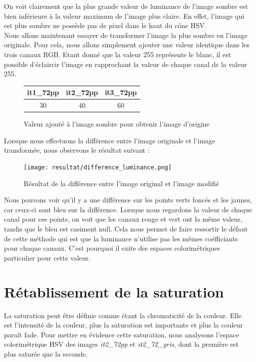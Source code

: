 \documentclass[a4paper,10pt]{article}
\begin{document}
On voit clairement que la plus grande valeur de luminance de l'image sombre est bien inférieure
à la valeur maximum de l'image plus claire. En effet, l'image qui est plus sombre ne possède pas de pixel dans le haut du cône HSV.\\

Nous allons maintenant essayer de transformer l'image la plus sombre en l'image originale. Pour cela,
nous allons simplement ajouter une valeur identique dans les trois canaux RGB. Etant donné que la valeur 255
représente le blanc, il est possible d'éclaircir l'image en rapprochant la valeur de chaque canal de la valeur 255.

\begin{figure}[!h]
	\begin{center}
	\begin{tabular}{|c|c|c|}
 		\hline
 		it1\_72pp & it2\_72pp & it3\_72pp\\
 		\hline
 		30 & 40 & 60\\
 		\hline
	\end{tabular}
	\caption{Valeur ajouté à l'image sombre pour obtenir l'image d'origine}
	\end{center}
\end{figure}

Lorsque nous effectuons la différence entre l'image originale et l'image transformée, nous observons le résultat suivant :

\begin{figure}[!h]
 \begin{center}
 \texttt{[image: resultat/difference\_luminance.png]}
 \caption{Résultat de la différence entre l'image original et l'image modifié}
 \end{center}
\end{figure}

Nous pouvons voir qu'il y a une différence sur les points verts foncés et les jaunes, car ceux-ci sont bleu sur la différence. Lorsque nous regardons la valeur de chaque canal pour ces points, on voit que les canaux rouge et vert ont la même valeur, tandis que le bleu est casiment null. Cela nous permet de faire ressortir le défaut de cette méthode qui est que la luminance n'utilise pas les mêmes coéfficiants pour chaque canaux. C'est pourquoi il exite des espaces colorimétriques particulier pour cette valeur. 

\section{Rétablissement de la saturation}
La saturation peut être définie comme étant la chromaticité de la couleur. Elle est l'intensité de la couleur, plus
la saturation est importante et plus la couleur paraît fade. Pour mettre en évidence cette saturation, nous analysons
l'espace colorimétrique HSV des images \textit{it2\_72pp} et \textit{it2\_72\_gris}, dont la première est plus saturée
que la seconde.\\
\end{document}
